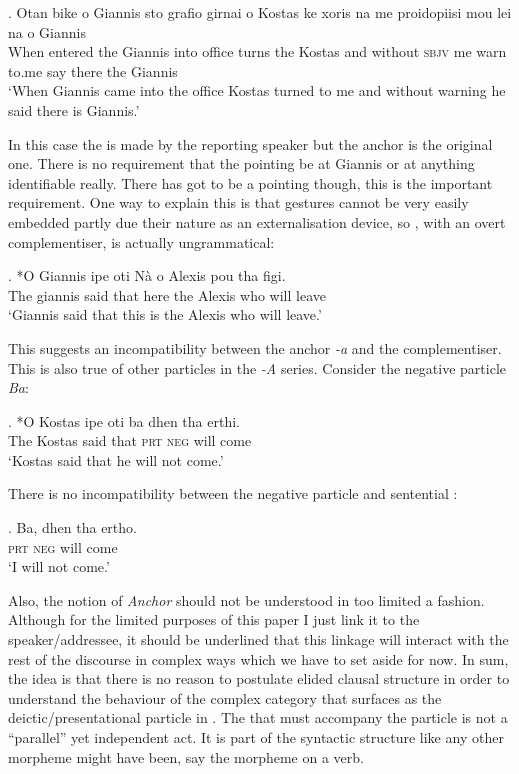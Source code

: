 \documentclass[output=paper]{LSP/langsci}
\begin{document}
\exg.
Otan bike o Giannis sto grafio girnai o Kostas ke xoris na me proidopiisi mou lei na \xspace\Pointinghand o Giannis\\
When entered the Giannis into office turns the Kostas and without \textsc{sbjv} me warn to.me say there \xspace\Pointinghand the Giannis\\
\glt `When Giannis came into the office Kostas turned to me and without warning he said there \xspace\Pointinghand is Giannis.'

In this case the  is made by the reporting speaker but the anchor is the original one.  There is no requirement that the pointing be at Giannis or at anything identifiable really.  There has got to be a pointing though, this is the important requirement.
One way to explain this is that gestures cannot be  very easily embedded partly due their nature as an externalisation device, so \Next, with an overt complementiser, is actually ungrammatical:

\exg.
*O Giannis ipe oti N\`{a} \Pointinghand \xspace o Alexis pou tha figi.\\
The giannis said that here \Pointinghand \xspace the Alexis who will leave\\
\glt `Giannis said that this is the Alexis who will leave.'

This suggests an incompatibility between the anchor \textit{-a} and the complementiser. This is also true of other particles in the \textit{-A} series.  Consider the negative particle \textit{Ba}:

\exg.
*O Kostas ipe oti ba dhen tha erthi.\\
The Kostas said that \textsc{prt} \textsc{neg} will come\\
\glt `Kostas said that he will not come.'

There is no incompatibility between the negative particle and sentential :

\exg.
Ba, dhen tha ertho.\\
\textsc{prt} \textsc{neg} will come\\
\glt `I will not come.'


Also, the notion of \textit{Anchor} should not be understood in too limited a fashion.  Although for the limited purposes of this paper I just link it to the speaker\slash addressee, it should be underlined that this linkage will interact with the rest of the discourse in complex ways which we have to set aside for now.  
In sum, the idea is that there is no reason to postulate elided clausal structure in order to understand the behaviour of the complex category that surfaces as the deictic\slash presentational particle \na in .  The  that must accompany the particle is not a ``parallel'' yet independent act.  It is part of the syntactic structure like any other morpheme might have been, say the  morpheme on a verb. 
\end{document}
